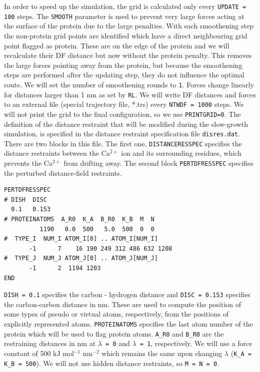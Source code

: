 In order to speed up the simulation, the grid is calculated only every \texttt{UPDATE = 100} steps. 
The \texttt{SMOOTH} parameter is used to prevent very large forces acting at the surface of the protein due to the large penalties. 
With each smoothening step the non-protein grid points are identified which have a direct neighbouring grid point flagged as protein. 
These are on the edge of the protein and we will recalculate their DF distance but now without the protein penalty. 
This removes the large forces pointing away from the protein, but because the smoothening steps are performed after the updating step, they do not influence the optimal route. 
We will set the number of smoothening rounds to \texttt{1}. Forces change linearly for distances larger than 1 nm as set by \texttt{RL}. 
We will write DF distances and forces to an external file (special trajectory file, *.trs) every \texttt{NTWDF = 1000} steps. We will not print the grid to the final configuration, so we use \texttt{PRINTGRID=0}. 
The definition of the distance restraint that will be modified during the slow-growth simulation, is specified in the distance restraint specification file \texttt{disres.dat}. 
There are two blocks in this file. 
The first one, \texttt{DISTANCERESSPEC} specifies the distance restraints between the Ca$^{2+}$ ion and its surrounding residues, which prevents the Ca$^{2+}$ from drifting away. 
The second block \texttt{PERTDFRESSPEC} specifies the perturbed distance-field restraints. 
\begin{lstlisting}
PERTDFRESSPEC
# DISH  DISC
  0.1   0.153
# PROTEINATOMS  A_R0  K_A  B_R0  K_B  M  N
          1190   0.0  500   5.0  500  0  0
#  TYPE_I  NUM_I ATOM_I[0] .. ATOM_I[NUM_I]
       -1      7    16 190 249 312 486 632 1208
#  TYPE_J  NUM_J ATOM_J[0] .. ATOM_J[NUM_J]
       -1      2  1194 1203
END
\end{lstlisting}
\texttt{DISH = 0.1} specifies the carbon - hydrogen distance and \texttt{DISC = 0.153} specifies the carbon-carbon distance in nm. 
These are used to compute the position of some types of pseudo or virtual atoms, respectively, from the positions of explicitly represented atoms.
\texttt{PROTEINATOMS} specifies the last atom number of the protein which will be used to flag protein atoms. 
\texttt{A\_R0} and \texttt{B\_R0} are the restraining distances in nm at \texttt{$\lambda$ = 0} and \texttt{$\lambda$ = 1}, respectively. 
We will use a force constant of 500 kJ mol$^{-1}$ nm$^{-2}$ which remains the same upon changing $\lambda$ (\texttt{K\_A = K\_B = 500}). 
We will not use hidden distance restraints, so \texttt{M = N = 0}. 

